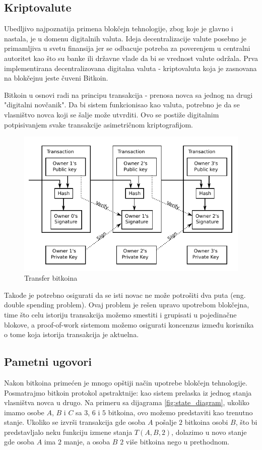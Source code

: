 \documentclass[a4paper]{article}
\begin{document}
{\subsection{Kriptovalute}
Ubedljivo najpoznatija primena blokčejn tehnologije, zbog koje je glavno i nastala, je u domenu digitalnih valuta.
Ideja decentralizacije valute posebno je primamljiva u svetu finansija jer se odbacuje potreba za poverenjem
u centralni autoritet kao što su banke ili državne vlade da bi se vrednost valute održala. 
Prva implementirana decentralizovana digitalna valuta - kriptovaluta koja je zasnovana na blokčejnu jeste čuveni Bitkoin.

Bitkoin u osnovi radi na principu transakcija - prenosa novca sa jednog na drugi "digitalni novčanik". Da bi sistem funkcionisao
kao valuta, potrebno je da se vlasništvo novca koji se šalje može utvrditi. Ovo se postiže digitalnim potpisivanjem svake transakcije
asimetričnom kriptografijom.

\begin{figure}[H]
    \centering
        \includegraphics[scale=0.8]{Bitcoin_Transaction_Visual.pdf}
    \caption{Transfer bitkoina}
    \label{fig:btc_transfer}
\end{figure}

Takođe je potrebno osigurati da se isti novac ne može potrošiti dva puta (eng. double spending problem).
Ovaj problem je rešen upravo upotrebom blokčejna, time što celu istoriju transakcija možemo smestiti i grupisati u pojedinačne blokove, a
proof-of-work sistemom možemo osigurati koncenzus između korisnika o tome koja istorija transakcija je aktuelna. 

\subsection{Pametni ugovori}
Nakon bitkoina primećen je mnogo opštiji način upotrebe blokčejn tehnologije.
Posmatrajmo bitkoin protokol apstraktnije: kao sistem prelaska iz jednog stanja vlasništva novca u drugo.
Na primeru sa dijagrama \ref{fig:state_diagram}, ukoliko imamo osobe $A$, $B$ i $C$ sa $3$, $6$ i $5$ bitkoina, ovo možemo predstaviti kao trenutno stanje.
Ukoliko se izvrši transakcija gde osoba $A$ pošalje $2$ bitkoina osobi $B$, što bi predstavljalo neku funkciju izmene stanja $T(A, B, 2)$, dolazimo u novo stanje gde osoba $A$ ima $2$ manje, a osoba $B$ $2$ više bitkoina nego u prethodnom.

}
\end{document}

